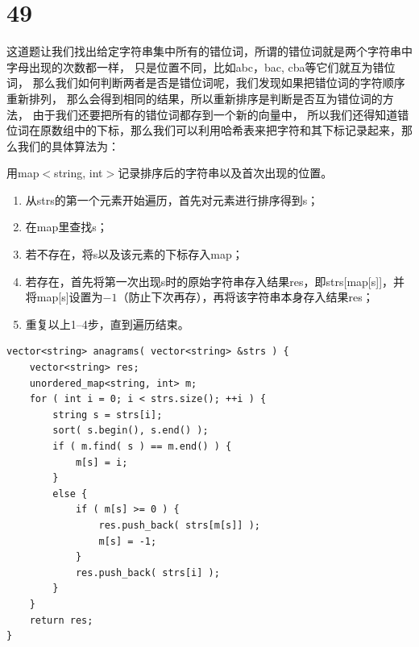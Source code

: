 \documentclass[12pt,a4paper]{article}
\begin{document}
\section{49}
\begin{CJK}{UTF8}{gbsn}
这道题让我们找出给定字符串集中所有的错位词，所谓的错位词就是两个字符串中字母出现的次数都一样，
只是位置不同，比如abc，bac, cba等它们就互为错位词，
那么我们如何判断两者是否是错位词呢，我们发现如果把错位词的字符顺序重新排列，
那么会得到相同的结果，所以重新排序是判断是否互为错位词的方法，
由于我们还要把所有的错位词都存到一个新的向量中，
所以我们还得知道错位词在原数组中的下标，那么我们可以利用哈希表来把字符和其下标记录起来，那么我们的具体算法为：
\par
用map$<$string, int$>$记录排序后的字符串以及首次出现的位置。
\begin{enumerate}
\item 从strs的第一个元素开始遍历，首先对元素进行排序得到s；
\item 在map里查找s；
\item 若不存在，将s以及该元素的下标存入map；
\item 若存在，首先将第一次出现s时的原始字符串存入结果res，即strs[map[s]]，并将map[s]设置为$-1$（防止下次再存），再将该字符串本身存入结果res；
\item 重复以上1--4步，直到遍历结束。
\end{enumerate}
\end{CJK}
\begin{lstlisting}
vector<string> anagrams( vector<string> &strs ) {
	vector<string> res;
	unordered_map<string, int> m;
	for ( int i = 0; i < strs.size(); ++i ) {
		string s = strs[i];
		sort( s.begin(), s.end() );
		if ( m.find( s ) == m.end() ) {
			m[s] = i;
		}
		else {
			if ( m[s] >= 0 ) {
				res.push_back( strs[m[s]] );
				m[s] = -1;
			}
			res.push_back( strs[i] );
		}
	}
	return res;
}
\end{lstlisting}
\end{document}
